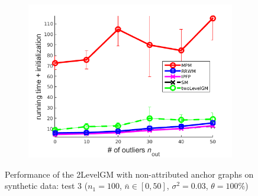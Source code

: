 \begin{figure}
\begin{subfigure}[b]{0.33\textwidth}
			\includegraphics[scale=0.25]{"chapter3/fig/SyntheticTest/no_descr/Results_v4.3.3/Test1/time_summary_avg10t"} 
		\end{subfigure} 	
	\caption[Performance of the 2LevelGM with non-attributed anchor graphs on synthetic data (test $3$)]{Performance of the 2LevelGM with non-attributed anchor graphs on synthetic data: test $3$ ($n_1=100$, $\bar{n}\in[0,50]$, $\sigma^2=0.03$, $\theta=100\%$)}
	\label{fig:synTest3_ver433}
\end{figure}
